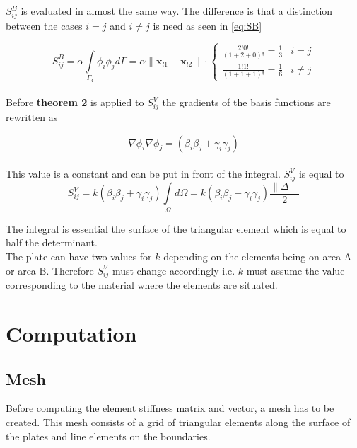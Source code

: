 \documentclass[10pt,a4paper]{article}
\begin{document}
$ S^B_{ij} $ is evaluated in almost the same way. The difference is that a distinction between the cases $i=j$ and $i\neq j$ is need as seen in \eqref{eq:SB}
 
 \begin{equation}\label{eq:SB}
 S^{B}_{ij} = \alpha\underset{\Gamma_4}{\int}  \phi_i  \phi_jd\Gamma  = \alpha \lVert \textbf{x}_{l1}-\textbf{x}_{l2}\rVert\cdot \begin{cases}
 \frac{2!0!}{(1+2+0)!} = \frac{1}{3} & i =j\\
 \frac{1!1!}{(1+1+1)!} = \frac{1}{6} & i \neq j
 \end{cases}
 \end{equation}
\\

Before 	\textbf{theorem 2} is applied to $S^V_{ij}$ the gradients of the basis functions are rewritten as 

\begin{equation*}
\nabla \phi_i  \nabla  \phi_j = \left(\beta_i \beta_j+\gamma_i \gamma_j\right) 
\end{equation*}
\\
This value is a constant and can be put in front of the  integral. $S^V_{ij}$ is equal to
\begin{equation}
 S^V_{ij} = k  \left(\beta_i \beta_j+\gamma_i \gamma_j\right)\underset{\Omega}{\int} d\Omega =k  \left(\beta_i \beta_j+\gamma_i \gamma_j\right)\frac{\lVert\Delta\rVert}{2}
\end{equation}

The integral is essential the surface of the triangular element which is equal to half the determinant. \\
The plate can have two values for $k$ depending on the elements being on area A or area B. Therefore $S^V_{ij}$ must change accordingly i.e. $k$ must assume the value corresponding to the material where the elements are situated.

\section{Computation}
\subsection{Mesh}
Before computing the element stiffness matrix and vector, a mesh has to be created. This mesh consists of a grid of triangular elements along the surface of the plates and line elements on the boundaries.\\
\end{document}
